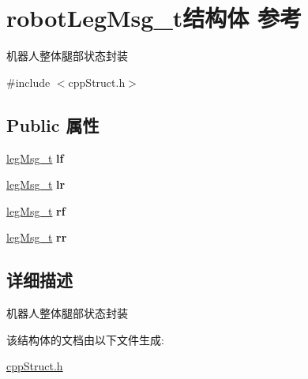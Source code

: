 \hypertarget{structrobotLegMsg__t}{}\section{robot\+Leg\+Msg\+\_\+t结构体 参考}
\label{structrobotLegMsg__t}


机器人整体腿部状态封装  




{\ttfamily \#include $<$cpp\+Struct.\+h$>$}

\subsection*{Public 属性}
\begin{DoxyCompactItemize}
\item 
\mbox{\label{structrobotLegMsg__t_a59be72bea9780d339c990a495fcfebee}} 
\hyperlink{structlegMsg__t}{leg\+Msg\+\_\+t} {\bfseries lf}
\item 
\mbox{\label{structrobotLegMsg__t_af6af9315d2fe4e8b906f2e9a064a7715}} 
\hyperlink{structlegMsg__t}{leg\+Msg\+\_\+t} {\bfseries lr}
\item 
\mbox{\label{structrobotLegMsg__t_a19dfc403ddc38ff3baf10ce436dbf996}} 
\hyperlink{structlegMsg__t}{leg\+Msg\+\_\+t} {\bfseries rf}
\item 
\mbox{\label{structrobotLegMsg__t_a8fdc4ab7bf24b2bdddf2f1fbf0fbfa20}} 
\hyperlink{structlegMsg__t}{leg\+Msg\+\_\+t} {\bfseries rr}
\end{DoxyCompactItemize}


\subsection{详细描述}
机器人整体腿部状态封装 

该结构体的文档由以下文件生成\+:\begin{DoxyCompactItemize}
\item 
\hyperlink{cppStruct_8h}{cpp\+Struct.\+h}\end{DoxyCompactItemize}
